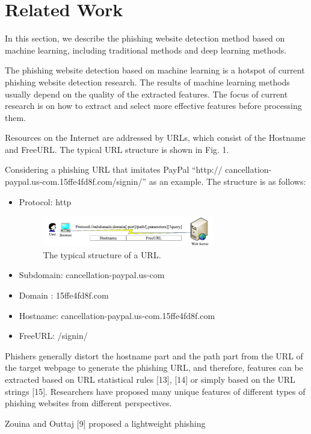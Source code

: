 \documentclass{ieeeaccess}
\begin{document}
\section{Related Work}
In this section, we describe the phishing website detection
method based on machine learning, including traditional
methods and deep learning methods.\par The phishing website detection based on machine learning
is a hotspot of current phishing website detection
research. The results of machine learning methods usually
depend on the quality of the extracted features. The focus of
current research is on how to extract and select more effective
features before processing them.\par Resources on the Internet are addressed by URLs, which
consist of the Hostname and FreeURL. The typical URL
structure is shown in Fig. 1. \par Considering a phishing URL that imitates PayPal ``http://
cancellation-paypal.us-com.15ffe4fd8f.com/signin/'' as an
example. The structure is as follows:
\begin{itemize}
    \item Protocol: http
    \begin{figure}
        \centering
        \includegraphics[width=\linewidth]{Figure1.png}
        \caption{The typical structure of a URL.}
        \label{fig:1}
    \end{figure}
    \item Subdomain: cancellation-paypal.us-com
    \item Domain : 15ffe4fd8f.com
    \item Hostname: cancellation-paypal.us-com.15ffe4fd8f.com
    \item FreeURL: /signin/
\end{itemize}\par Phishers generally distort the hostname part and the path
part from the URL of the target webpage to generate the
phishing URL, and therefore, features can be extracted based
on URL statistical rules [13], [14] or simply based on the
URL strings [15]. Researchers have proposed many unique
features of different types of phishing websites from different
perspectives.\par Zouina and Outtaj [9] proposed a lightweight phishing
\end{document}
